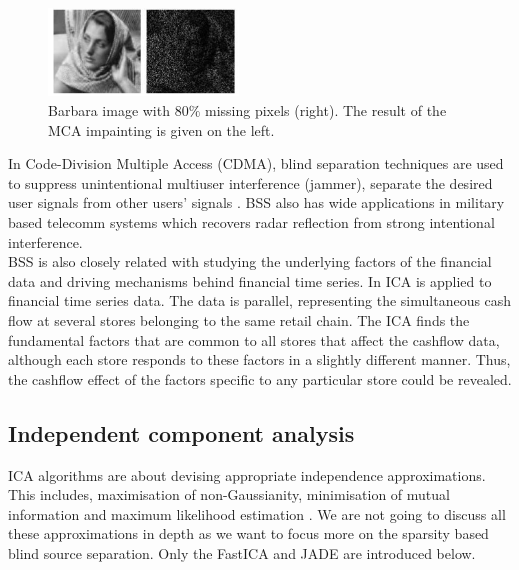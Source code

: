 \begin{figure}[!htbp]
\centering
\includegraphics[width=0.45\textwidth]{images/impainting1.png}
\caption{Barbara image with $80\%$ missing pixels (right). The result of the MCA impainting is
given on the left.}
\label{imapint_1}
\end{figure}

In Code-Division Multiple Access (CDMA), blind separation techniques are used to suppress unintentional multiuser interference (jammer), separate the desired user signals from other users' signals \cite{Raju2006}. BSS also has wide applications in military based telecomm systems which recovers radar reflection from strong intentional interference.\\

BSS is also closely related with studying the underlying factors of the financial data and driving mechanisms behind financial time series. In \cite{OjaE2000Icaf} ICA is applied to financial time series data. The data is parallel, representing the simultaneous cash flow at several stores belonging to the same retail chain. The ICA finds the fundamental factors that are common to all stores that affect the cashflow data, although each store responds to these factors in a slightly different manner. Thus, the cashflow effect of the factors specific to any particular store could be revealed.

\subsection{Independent component analysis}
ICA algorithms are about devising appropriate independence approximations. This includes, maximisation of non-Gaussianity, minimisation of mutual information and maximum likelihood estimation \cite{HYVARINEN2000411}. We are not going to discuss all these approximations in depth as we want to focus more on the sparsity based blind source separation. Only the FastICA and JADE are introduced below.\\

